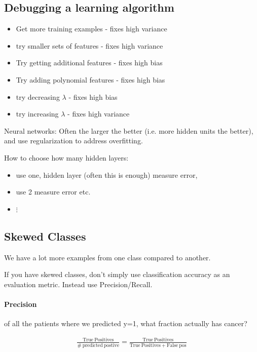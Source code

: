 \documentclass[fontsize=11]{article}
\begin{document}
\subsection{Debugging a learning algorithm}

\begin{itemize}
\item Get more training examples - fixes high variance
\item try smaller sets of features - fixes high variance
\item Try getting additional features - fixes high bias
\item Try adding polynomial features - fixes high bias
\item try decreasing $\lambda$ - fixes high bias
\item try increasing $\lambda$ - fixes high variance
\end{itemize}

Neural networks:
Often the larger the better (i.e. more hidden units the better), and use regularization to address overfitting.

How to choose how many hidden layers:
\begin{itemize}
\item[] use one, hidden layer (often this is enough) measure error, 
\item[] use 2 measure error etc.
\item[] $\vdots$
\end{itemize}

\subsection{Skewed Classes}
We have a lot more examples from one class compared to another.

If you have skewed classes, don't simply use classification accuracy as an evaluation metric. Instead use Precision/Recall. 

\paragraph{Precision}
of all the patients where we predicted y=1, what fraction actually has cancer?

\begin{align*}
\frac{\mathrm{True \ Positives}}{\# \mathrm{\ predicted \ postive}} = \frac{\mathrm{True \ Positives}}{\mathrm{True \ Positives} + \mathrm{False \ pos}}
\end{align*}
\end{document}
